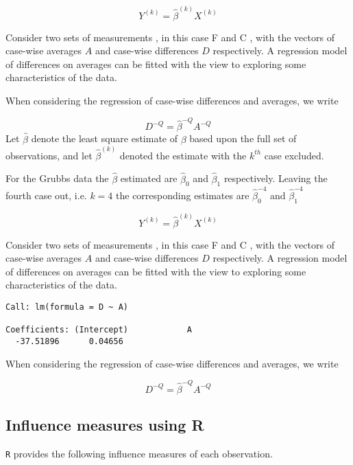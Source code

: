 \documentclass[12pt, a4paper]{report}
\theoremstyle{plain}
\theoremstyle{definition}
\theoremstyle{remark}
\begin{document}
\newpage

\begin{equation}
Y^{(k)} = \hat{\beta}^{(k)}X^{(k)}
\end{equation}

Consider two sets of measurements , in this case F and C , with the vectors of case-wise averages $A$ and case-wise differences $D$ respectively. A regression model of differences on averages can be fitted with the view to exploring some characteristics of the data.

When considering the regression of case-wise differences and averages, we write

\begin{equation}
D^{-Q} = \hat{\beta}^{-Q}A^{-Q}
\end{equation}
Let $\hat{\beta}$ denote the least square estimate of $\beta$ based upon the full set of observations, and let $\hat{\beta}^{(k)}$ denoted the estimate with the $k^{th}$ case excluded.

For the Grubbs data the $\hat{\beta}$ estimated are $\hat{\beta}_{0}$ and $\hat{\beta}_{1}$ respectively. Leaving the
fourth case out, i.e. $k=4$ the corresponding estimates are $\hat{\beta}_{0}^{-4}$ and $\hat{\beta}_{1}^{-4}$

\begin{equation}
Y^{(k)} = \hat{\beta}^{(k)}X^{(k)}
\end{equation}

Consider two sets of measurements , in this case F and C , with the vectors of case-wise averages $A$ and case-wise differences $D$ respectively. A regression model of differences on averages can be fitted with the view to exploring some characteristics of the data.

\begin{verbatim}
Call: lm(formula = D ~ A)

Coefficients: (Intercept)            A
  -37.51896      0.04656

\end{verbatim}




When considering the regression of case-wise differences and averages, we write

\begin{equation}
D^{-Q} = \hat{\beta}^{-Q}A^{-Q}
\end{equation}



\subsection{Influence measures using R} %
\texttt{R} provides the following influence measures of each observation.
\end{document}
